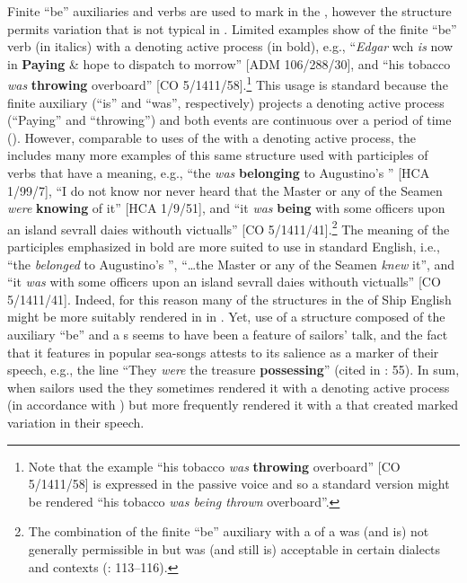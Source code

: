 {Finite “be” auxiliaries and  verbs are used to mark  in the , however the structure permits variation that is not typical in . Limited examples show  of the finite “be” verb (in italics) with a   denoting active process (in bold), e.g., “\textit{Edgar} wch \textit{is} now in \textbf{Paying} \& hope to dispatch to morrow” [ADM 106/288/30], and “his tobacco \textit{was} \textbf{throwing} overboard” [CO 5/1411/58].\footnote{Note that the example “his tobacco \textit{was} \textbf{throwing} overboard” [CO 5/1411/58] is expressed in the passive voice and so a standard version might be rendered “his tobacco \textit{was being thrown} overboard”.} This usage is standard because the finite auxiliary (“is” and “was”, respectively) projects a  denoting active process (“Paying” and “throwing”) and both events are continuous over a period of time (\citealt{SILInternational2005}).
However, comparable to uses of the  with a  denoting active process, the  includes many more examples of this same structure used with participles of verbs that have a  meaning, e.g., “the  \textit{was} \textbf{belonging} to Augustino’s ” [HCA 1/99/7], “I do not know nor never heard that the Master or any of the Seamen \textit{were} \textbf{knowing} of it” [HCA 1/9/51], and “it \textit{was} \textbf{being} with some officers upon an island sevrall daies withouth victualls” [CO 5/1411/41].\footnote{The combination of the finite “be” auxiliary with a  of a   was (and is) not generally permissible in  but was (and still is) acceptable in certain dialects and contexts (\citealt{Römer2005}: 113–116).} The  meaning of the participles emphasized in bold are more suited to   use in standard English, i.e., “the  \textit{belonged} to Augustino’s ”, “…the Master or any of the Seamen \textit{knew} it”, and “it \textit{was} with some officers upon an island sevrall daies withouth victualls” [CO 5/1411/41]. Indeed, for this reason many of the  structures in the  of Ship English might be more suitably rendered in   in . Yet, use of a structure composed of the auxiliary “be” and a  s seems to have been a feature of sailors’ talk, and the fact that it features in popular sea-songs attests to its salience as a marker of their speech, e.g., the line “They \textit{were} the treasure \textbf{possessing}” (cited in \citealt{Palmer1986}: 55). In sum, when sailors used the  they sometimes rendered it with a  denoting active process (in accordance with ) but more frequently rendered it with a   that created marked variation in their speech. 
}

